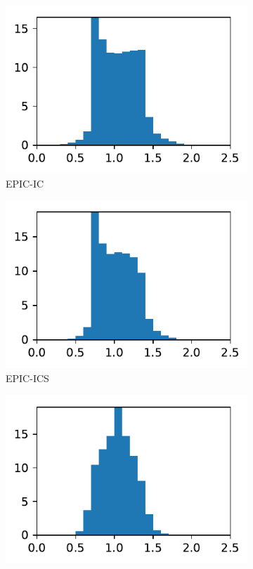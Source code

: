 \documentclass[3p,times,procedia,number]{elsarticle}
\begin{document}
\begin{figure}
\begin{subfigure}{.16\textwidth}
\centering
\includegraphics[width=\textwidth]{epic-ic-cube-linear-length.pdf}
\caption{EPIC-IC}
\end{subfigure}
\begin{subfigure}{.16\textwidth}
\centering
\includegraphics[width=\textwidth]{epic-ics-cube-linear-length.pdf}
\caption{EPIC-ICS}
\end{subfigure}
\begin{subfigure}{.16\textwidth}
\centering
\includegraphics[width=\textwidth]{epic-icsm-cube-linear-length.pdf}

\end{subfigure}
\end{figure}
\end{document}
